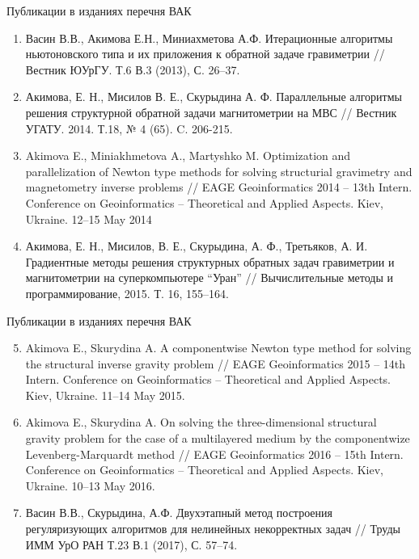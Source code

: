 \documentclass[10pt,pdf, mathserif, hyperref={unicode}]{beamer}
\begin{document}
\begin{frame}{Публикации в изданиях перечня ВАК}
	\begin{enumerate}
		\item Васин В.В., Акимова Е.Н., Миниахметова А.Ф. Итерационные алгоритмы ньютоновского типа и их приложения к обратной задаче гравиметрии // Вестник ЮУрГУ. Т.6 В.3 (2013), С. 26–37.
		\item Акимова, Е. Н., Мисилов В. Е., Скурыдина А. Ф. Параллельные алгоритмы решения структурной обратной задачи магнитометрии на МВС // Вестник УГАТУ. 2014. Т.18, № 4 (65). C. 206-215.
		\item Akimova E., Miniakhmetova A., Martyshko M. Optimization and parallelization of Newton type methods for solving structurial gravimetry and magnetometry inverse problems // EAGE Geoinformatics 2014 – 13th Intern. Conference on Geoinformatics – Theoretical and Applied Aspects. Kiev, Ukraine. 12–15 May 2014
		\item Акимова, Е. Н., Мисилов, В. Е., Скурыдина, А. Ф., Третьяков, А. И. Градиентные методы решения структурных обратных задач гравиметрии и магнитометрии на суперкомпьютере “Уран” // Вычислительные методы и программирование, 2015. Т. 16, 155–164.
		
	\end{enumerate}
\end{frame}
\begin{frame}{Публикации в изданиях перечня ВАК}
	\begin{enumerate}
		\setcounter{enumi}{4}
		\item Akimova E., Skurydina A. A componentwise Newton type method for solving the structural inverse gravity problem // EAGE Geoinformatics 2015 – 14th Intern. Conference on Geoinformatics – Theoretical and Applied Aspects. Kiev, Ukraine. 11–14 May 2015.
		\item Akimova E., Skurydina A. On solving the three-dimensional structural gravity problem for the case of a multilayered medium by the componentwize Levenberg-Marquardt method // EAGE Geoinformatics 2016 – 15th Intern. Conference on Geoinformatics – Theoretical and Applied Aspects. Kiev, Ukraine. 10–13 May 2016.
		\item Васин В.В., Скурыдина, А.Ф. Двухэтапный метод построения регуляризующих алгоритмов для нелинейных некорректных задач // Труды ИММ УрО РАН Т.23 В.1 (2017), С. 57–74.
	\end{enumerate}
\end{frame}
\end{document}
